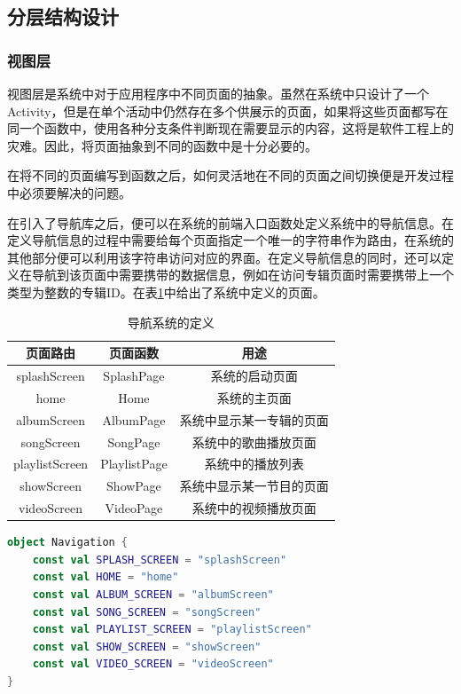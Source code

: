 \documentclass[main.tex]{subfiles}
\begin{document}
\subsection{分层结构设计}

\subsubsection{视图层}

视图层是系统中对于应用程序中不同页面的抽象。虽然在系统中只设计了一个Activity，但是在单个活动中仍然存在多个供展示的页面，如果将这些页面都写在同一个函数中，使用各种分支条件判断现在需要显示的内容，这将是软件工程上的灾难。因此，将页面抽象到不同的函数中是十分必要的。

在将不同的页面编写到函数之后，如何灵活地在不同的页面之间切换便是开发过程中必须要解决的问题。

在引入了导航库之后，便可以在系统的前端入口函数处定义系统中的导航信息。在定义导航信息的过程中需要给每个页面指定一个唯一的字符串作为路由，在系统的其他部分便可以利用该字符串访问对应的界面。在定义导航信息的同时，还可以定义在导航到该页面中需要携带的数据信息，例如在访问专辑页面时需要携带上一个类型为整数的专辑ID。在表\ref{tab:navigation-definion}中给出了系统中定义的页面。

\begin{table}[htbp]
    \centering
    \begin{tabular}{|c|c|c|}
        \hline
        \textbf{页面路由} & \textbf{页面函数} & \textbf{用途} \\
        \hline
         splashScreen & SplashPage & 系统的启动页面 \\
         home & Home & 系统的主页面 \\
         albumScreen & AlbumPage & 系统中显示某一专辑的页面 \\
         songScreen  & SongPage & 系统中的歌曲播放页面 \\
         playlistScreen & PlaylistPage & 系统中的播放列表 \\
         showScreen & ShowPage & 系统中显示某一节目的页面 \\
         videoScreen & VideoPage & 系统中的视频播放页面 \\
         \hline
    \end{tabular}
    \caption{导航系统的定义}
    \label{tab:navigation-definion}
\end{table}

\begin{lstlisting}[language=Kotlin]
    object Navigation {
    const val SPLASH_SCREEN = "splashScreen"
    const val HOME = "home"
    const val ALBUM_SCREEN = "albumScreen"
    const val SONG_SCREEN = "songScreen"
    const val PLAYLIST_SCREEN = "playlistScreen"
    const val SHOW_SCREEN = "showScreen"
    const val VIDEO_SCREEN = "videoScreen"
}
\end{lstlisting}
\end{document}
